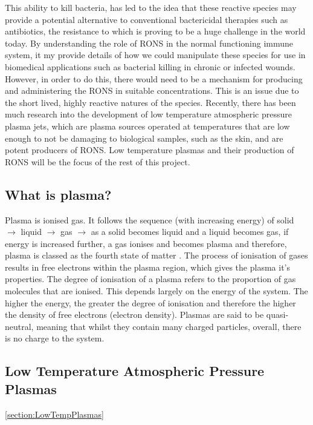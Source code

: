 \documentclass[11pt, oneside]{article}   	%
\begin{document}
This ability to kill bacteria, has led to the idea that these reactive species may provide a potential alternative to conventional bactericidal therapies such as antibiotics, the resistance to which is proving to be a huge challenge in the world today. 
By understanding the role of RONS in the normal functioning immune system, it my provide details of how we could manipulate these species for use in biomedical applications such as bacterial killing in chronic or infected wounds.
However, in order to do this, there would need to be a mechanism for producing and administering the RONS in suitable concentrations.
This is an issue due to the short lived, highly reactive natures of the species.
Recently, there has been much research into the development of low temperature atmospheric pressure plasma jets, which are plasma sources operated at temperatures that are low enough to not be damaging to biological samples, such as the skin, and are potent producers of RONS. 
Low temperature plasmas and their production of RONS will be the focus of the rest of this project.



\subsection{What is plasma?}
Plasma is ionised gas.
It follows the sequence (with increasing energy) of solid $\rightarrow$ liquid $\rightarrow$ gas $\rightarrow$ 
as a solid becomes liquid and a liquid becomes gas, if energy is increased further, a gas ionises and becomes plasma and therefore, plasma is classed as the fourth state of matter \cite{Fridman2013PlasmaMedicine}. 
The process of ionisation of gases results in free electrons within the plasma region, which gives the plasma it's properties.
The degree of ionisation of a plasma refers to the proportion of gas molecules that are ionised.
This depends largely on the energy of the system. 
The higher the energy, the greater the degree of ionisation and therefore the higher the density of free electrons (electron density).
Plasmas are said to be quasi-neutral, meaning that whilst they contain many charged particles, overall, there is no charge to the system.

\subsection{Low Temperature Atmospheric Pressure Plasmas} \ref{section:LowTempPlasmas}
\end{document}

